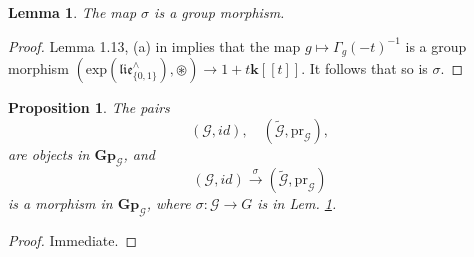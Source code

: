 \documentclass[10pt]{amsart}
\newtheorem{lem}[thm]{Lemma}
\newtheorem{prop}[thm]{Proposition}
\numberwithin{equation}{subsection}
\begin{document}
\begin{lem}\label{lem:sigma:3107:BIS}
The map $\sigma$ is a group morphism.  
\end{lem}

\begin{proof}
Lemma 1.13, (a) in \cite{EF2} implies that the map $g\mapsto \Gamma_g(-t)^{-1}$ is a group morphism 
$(\mathrm{exp}(\mathfrak{lie}_{\{0,1\}}^\wedge),\circledast)\to 1+t\mathbf k[[t]]$. 
It follows that so is $\sigma$. 
\end{proof}


\begin{prop}\label{prop:1:8}
The pairs
$$
(\mathcal G,id),\quad (\tilde{\mathcal G},\mathrm{pr}_{\mathcal G}), 
$$
are objects in $\mathbf{Gp}_{\mathcal G}$, and 
$$
(\mathcal G,id)\stackrel{\sigma}{\to} (\tilde{\mathcal G},\mathrm{pr}_{\mathcal G}) 
$$ 
is a morphism in $\mathbf{Gp}_{\mathcal G}$, where $\sigma : \mathcal G\to G$ 
is in Lem. \ref{lem:sigma:3107:BIS}. 
\end{prop}

\begin{proof}
Immediate.  
\end{proof}
\end{document}
